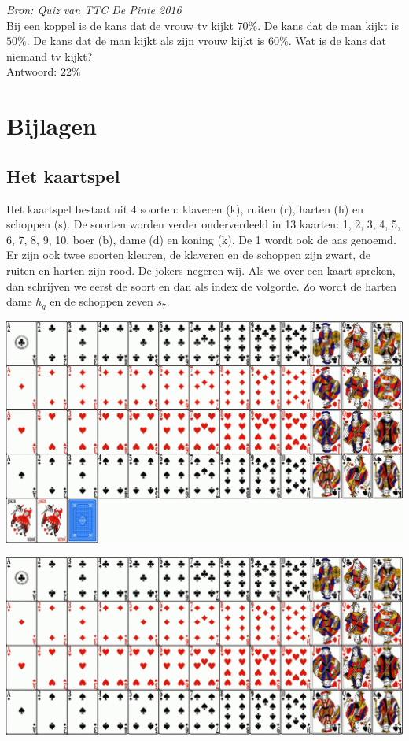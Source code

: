 \documentclass[12pt,twoside]{article}
\begin{document}
\begin{oefening}
  {\em \small Bron: Quiz van TTC De Pinte 2016\\}
  Bij een koppel is de kans dat de vrouw tv kijkt $70\%$. De kans dat de man kijkt is $50\%$. De kans dat de man kijkt als zijn vrouw kijkt is $60\%$. Wat is de kans dat niemand tv kijkt?\\
  Antwoord: $22\%$
\end{oefening}

\newpage
\appendix
\section*{Bijlagen}

\subsection*{Het kaartspel}
Het kaartspel bestaat uit 4 soorten: klaveren (k), ruiten (r), harten (h) en schoppen (s). De soorten worden verder onderverdeeld in 13 kaarten: 1, 2, 3, 4, 5, 6, 7, 8, 9, 10, boer (b), dame (d) en koning (k). De 1 wordt ook de aas genoemd. Er zijn ook twee soorten kleuren, de klaveren en de schoppen zijn zwart, de ruiten en harten zijn rood. De jokers negeren wij. Als we over een kaart spreken, dan schrijven we eerst de soort en dan als index de volgorde. Zo wordt de harten dame $h_q$ en de schoppen zeven $s_7$.

\includegraphics[width=\textwidth, angle=0]{kaartspel}

\newpage
\thispagestyle{empty}
\includegraphics[width=1.4\textwidth, angle=90]{kaartspel_2}
\end{document}
